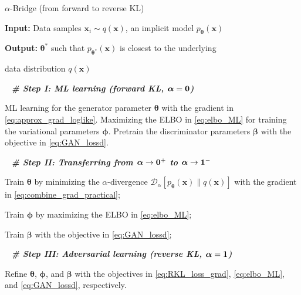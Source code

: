 \documentclass[letterpaper]{article} %
\newcommand{\Dc}[0]{\ensuremath{\mathcal{D}} }
\newcommand{\xv}[0]{\ensuremath{\boldsymbol{x}} }
\newcommand{\alphav}[0]{\ensuremath{\boldsymbol{\alpha}} }
\newcommand{\betav}[0]{\ensuremath{\boldsymbol{\beta}} }
\newcommand{\thetav}[0]{\ensuremath{\boldsymbol{\theta}} }
\newcommand{\phiv}[0]{\ensuremath{\boldsymbol{\phi}} }
\begin{document}
\begin{algorithm}[tb]
  \caption{$\alpha$-Bridge (from forward to reverse KL)}
  \label{alg:Alpha-divergence}
    \begin{algorithmic}[1]
    
    \item[\textbf{Input:} Data samples $\xv_i \sim q(\xv)$, an implicit model $p_{\thetav}(\xv)$]
    
    \item[\textbf{Output:} $\thetav^{*}$ such that $p_{\thetav^{*}}(\xv)$ is closest to the underlying ]
    \item[\qquad\qquad data distribution $q(\xv)$]

      \item[\,\,\, \textit{\textbf{\# Step I: ML learning (forward KL, $\bf \alphav=0$)}}]
      
      \STATE ML learning for the generator parameter $\thetav$ with the gradient in \eqref{eq:approx_grad_loglike}. Maximizing the ELBO in \eqref{eq:elbo_ML} for training the variational parameters $\phiv$. Pretrain the discriminator parameters $\betav$ with the objective in \eqref{eq:GAN_lossd}.
       
      \item[\,\,\, \textit{\textbf{\# Step II: Transferring from $\bf \alphav \to 0^{+}$ to $\bf \alphav \to 1^{-}$}}]
       

		\STATE Train $\thetav$ by minimizing the $\alpha$-divergence $\Dc_{\alpha} [p_{\thetav}(\xv) \| q(\xv)]$ with the gradient in \eqref{eq:combine_grad_practical};
		
		\STATE Train $\phiv$ by maximizing the ELBO in \eqref{eq:elbo_ML};

      	\STATE Train $\betav$ with the objective in \eqref{eq:GAN_lossd};      
      
      \ENDFOR
    
      \item[\,\,\, \textit{\textbf{\# Step III: Adversarial learning (reverse KL, $\bf \alphav=1$)}}]
    
      \STATE Refine $\thetav$, $\phiv$, and $\betav$ with the objectives in \eqref{eq:RKL_loss_grad}, \eqref{eq:elbo_ML}, and \eqref{eq:GAN_lossd}, respectively.
      
    \end{algorithmic}
\end{algorithm}
\end{document}
